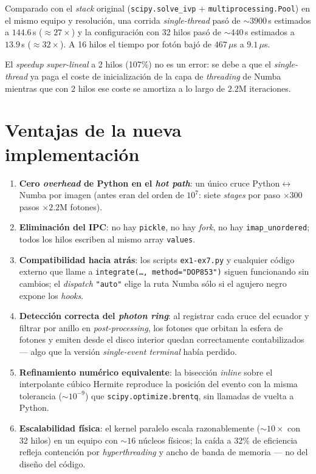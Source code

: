 \documentclass[11pt,a4paper]{article}
\begin{document}
Comparado con el \emph{stack} original (\texttt{scipy.solve\_ivp} +
\texttt{multiprocessing.Pool}) en el mismo equipo y resolución, una
corrida \emph{single-thread} pasó de $\sim 3900$\,s estimados a
$144.6$\,s ($\approx 27\times$) y la configuración con 32 hilos pasó de
$\sim 440$\,s estimados a $13.9$\,s ($\approx 32\times$). A 16 hilos
el tiempo por fotón bajó de $467\,\mu$s a $9.1\,\mu$s.

El \emph{speedup} \emph{super-lineal} a 2 hilos (107\%) no es un error:
se debe a que el \emph{single-thread} ya paga el coste de inicialización
de la capa de \emph{threading} de Numba mientras que con 2 hilos ese
coste se amortiza a lo largo de $2.2$M iteraciones.

\section{Ventajas de la nueva implementación}

\begin{enumerate}
  \item \textbf{Cero \emph{overhead} de Python en el \emph{hot path}}:
        un único cruce Python$\leftrightarrow$Numba por imagen (antes
        eran del orden de $10^{7}$: siete \emph{stages}
        por paso $\times 300$ pasos $\times 2.2$M fotones).
  \item \textbf{Eliminación del IPC}: no hay \texttt{pickle}, no hay
        \emph{fork}, no hay \texttt{imap\_unordered}; todos los hilos
        escriben al mismo array \texttt{values}.
  \item \textbf{Compatibilidad hacia atrás}: los scripts
        \texttt{ex1-ex7.py} y cualquier código externo que llame a
        \texttt{integrate(\ldots, method="DOP853")} siguen funcionando
        sin cambios; el \emph{dispatch} \verb|"auto"| elige la ruta
        Numba sólo si el agujero negro expone los \emph{hooks}.
  \item \textbf{Detección correcta del \emph{photon ring}}: al registrar
        cada cruce del ecuador y filtrar por anillo en
        \emph{post-processing}, los fotones que orbitan la esfera de
        fotones y emiten desde el disco interior quedan correctamente
        contabilizados --- algo que la versión \emph{single-event
        terminal} había perdido.
  \item \textbf{Refinamiento numérico equivalente}: la bisección
        \emph{inline} sobre el interpolante cúbico Hermite reproduce
        la posición del evento con la misma tolerancia
        ($\sim 10^{-9}$) que \texttt{scipy.optimize.brentq}, sin
        llamadas de vuelta a Python.
  \item \textbf{Escalabilidad física}: el kernel paralelo escala
        razonablemente ($\sim 10\times$ con 32 hilos) en un equipo con
        $\sim 16$ núcleos físicos; la caída a 32\% de eficiencia refleja
        contención por \emph{hyperthreading} y ancho de banda de memoria
        --- no del diseño del código.
\end{enumerate}
\end{document}
